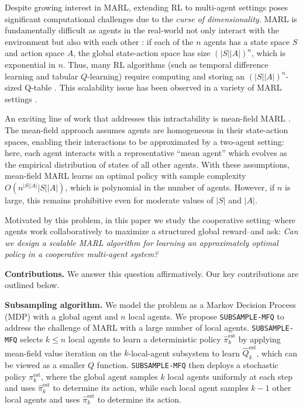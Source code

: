 \documentclass{article}
\theoremstyle{plain}
\theoremstyle{definition}
\def\est{\mathrm{est}}
\begin{document}
Despite growing interest in MARL, extending RL to multi-agent settings poses significant computational challenges due to the \emph{curse of dimensionality}. MARL is fundamentally difficult as agents in the real-world not only interact with the environment but also with each other \citep{Shapley195317AV}: if each of the $n$ agents has a state space $S$ and action space $A$, the global state-action space has size $(|S||A|)^n$, which is exponential in $n$. Thus, many RL algorithms (such as temporal difference learning and tabular $Q$-learning) require computing and storing an $(|S||A|)^n$-sized Q-table \citep{Sutton_McAllester_Singh_Mansour_1999, 10.5555/560669}. This scalability issue has been observed in a variety of MARL settings \citep{Blondel_Tsitsiklis_2000,b0e74184-2114-3e45-b092-dfbc8fefcf91,littman}.

An exciting line of work that addresses this intractability is mean-field MARL 
 \citep{Lasry_Lions_2007,pmlr-v80-yang18d,doi:10.1137/20M1360700,gu2022meanfield,Hu_Wei_Yan_Zhang_2023}. The mean-field approach assumes agents are homogeneous in their state-action spaces, enabling their interactions to be approximated by a two-agent setting: here, each agent interacts with a representative ``mean agent'' which evolves as the empirical distribution of states of all other agents. With these assumptions, mean-field MARL learns an optimal policy with sample complexity $O(n^{|S||A|}|S||A|)$, which is polynomial in the number of agents. However, if $n$ is large, this remains prohibitive even for moderate values of $|S|$ and  $|A|$.

Motivated by this problem, in this paper we study the cooperative setting--where agents work collaboratively to maximize a structured global reward--and ask: \emph{Can we design a scalable MARL algorithm for learning an approximately optimal policy in a cooperative multi-agent system?}

\textbf{Contributions.} We answer this question affirmatively. Our key contributions are outlined below. 
 

\textbf{Subsampling algorithm.} We model the problem as a Markov Decision Process (MDP) with a global agent and $n$ local agents. We propose
 \texttt{SUBSAMPLE-MFQ} to address the challenge of MARL with a large number of local agents. \texttt{SUBSAMPLE-MFQ} selects $k\leq n$ local agents to learn a deterministic policy $\hat{\pi}^\est_{k}$ by applying mean-field value iteration on the $k$-local-agent subsystem to learn $\hat{Q}_{k}^\est$, which can be viewed as a smaller $Q$ function. \texttt{SUBSAMPLE-MFQ} then deploys a stochastic policy ${\pi}^\est_{k}$, where the global agent samples $k$ local agents uniformly at each step and uses $\hat{\pi}^\est_{k}$ to determine its action, while each local agent samples $k-1$ other local agents and uses $\hat{\pi}^\est_{k}$ to determine its action.
\end{document}
